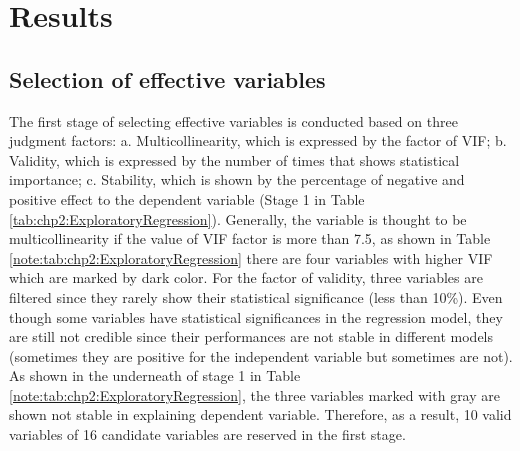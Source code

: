 %
\section{Results}
\subsection{Selection of effective variables}
%
The first stage of selecting effective variables is conducted based on three judgment factors: a. Multicollinearity, which is expressed by the factor of VIF; b. Validity, which is expressed by the number of times that shows statistical importance; c. Stability, which is shown by the percentage of negative and positive effect to the dependent variable (Stage 1 in Table \ref{tab:chp2:ExploratoryRegression}). Generally, the variable is thought to be multicollinearity if the value of VIF factor is more than 7.5, as shown in Table \ref{note:tab:chp2:ExploratoryRegression} there are four variables with higher VIF which are marked by dark color. For the factor of validity, three variables are filtered since they rarely show their statistical significance (less than 10\%). Even though some variables have statistical significances in the regression model, they are still not credible since their performances are not stable in different models (sometimes they are positive for the independent variable but sometimes are not). As shown in the underneath of stage 1 in Table \ref{note:tab:chp2:ExploratoryRegression}, the three variables marked with gray are shown not stable in explaining dependent variable. Therefore, as a result, 10 valid variables of 16 candidate variables are reserved in the first stage.

